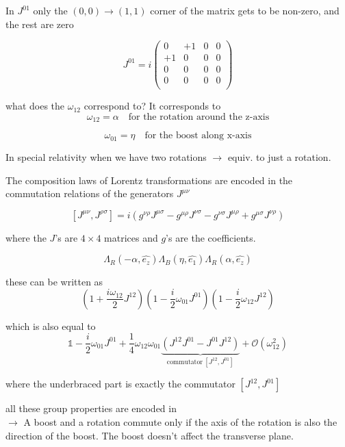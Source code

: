 \documentclass[11pt]{article}
\begin{document}
 
 In $ J^{01}$ only the $(0, 0) \rightarrow (1, 1)$ corner of the matrix gets to be non-zero, and the rest are zero
 
 \[ J^{01} = i \begin{pmatrix}
 	0 & +1 & 0 & 0\\
 	+1 & 0 & 0 & 0\\
 	0 & 0 & 0& 0\\
 	0 & 0 & 0& 0\\
 \end{pmatrix}\]
 
 
 what does the $\omega_{12}$ correspond to? It corresponds to \[\omega_{12} = \alpha \quad \text{for the rotation around the z-axis}\]
 
 \vspace{-16pt}
 \[ \omega_{01} = \eta \quad \text{for the boost along x-axis}\]
 
 In special relativity when we have two rotations $\rightarrow$ equiv. to just a rotation.
 
 The composition laws of Lorentz transformations are encoded in the commutation relations of the generators $J^{\mu\nu}$
 
 
 \[ [ J^{\mu\nu}, J^{\rho\sigma}] = i(g^{\nu\rho}J^{\mu\sigma} - g^{\mu\rho} J^{\nu\sigma} - g^{\nu\sigma} J^{\mu\rho} + g^{\mu\sigma} J^{\nu\rho})\]
 
 where the $J$'s are $4\times 4$ matrices and $g$'s are the coefficients.
 
 \[ \Lambda_R(-\alpha, \hat{e_z}) \Lambda_B(\eta, \hat{e_1}) \Lambda_R(\alpha, \hat{e_z}) \]
 
 these can be written as \[ \left( 1 + \frac{i\omega_{12}}{2}J^{12} \right) \left( 1 - \frac{i}{2} \omega_{01}J^{01}\right)  \left(1 - \frac{i}{2} \omega_{12} J^{12}\right) \]
 
 which is also equal to \[ \mathbb{1} - \frac{i}{2}\omega_{01}J^{01} + \frac{1}{4} \omega_{12}\omega_{01} \underbrace{(J^{12} J^{01} - J^{01}J^{12})}_{\text{commutator}\ [J^{12}, J^{01}]} + \mathcal{O}(\omega_{12}^2)\]
 
 where the underbraced part is exactly the commutator $[J^{12}, J^{01}]$
 
 all these group properties are encoded in \\
 
 $\rightarrow$ A boost and a rotation commute only if the axis of the rotation is also the direction of the boost. The boost doesn't affect the transverse plane.\\
\end{document}
